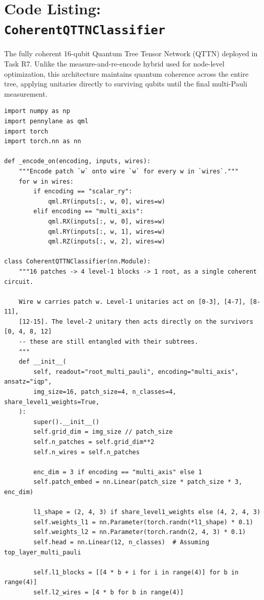 \documentclass[12pt, a4paper, oneside]{report}
\begin{document}
\section*{Code Listing: \texttt{CoherentQTTNClassifier}}
The fully coherent 16-qubit Quantum Tree Tensor Network (QTTN) deployed in Task R7. Unlike the measure-and-re-encode hybrid used for node-level optimization, this architecture maintains quantum coherence across the entire tree, applying unitaries directly to surviving qubits until the final multi-Pauli measurement.

\begin{verbatim}
import numpy as np
import pennylane as qml
import torch
import torch.nn as nn

def _encode_on(encoding, inputs, wires):
    """Encode patch `w` onto wire `w` for every w in `wires`."""
    for w in wires:
        if encoding == "scalar_ry":
            qml.RY(inputs[:, w, 0], wires=w)
        elif encoding == "multi_axis":
            qml.RX(inputs[:, w, 0], wires=w)
            qml.RY(inputs[:, w, 1], wires=w)
            qml.RZ(inputs[:, w, 2], wires=w)

class CoherentQTTNClassifier(nn.Module):
    """16 patches -> 4 level-1 blocks -> 1 root, as a single coherent circuit.

    Wire w carries patch w. Level-1 unitaries act on [0-3], [4-7], [8-11],
    [12-15]. The level-2 unitary then acts directly on the survivors [0, 4, 8, 12]
    -- these are still entangled with their subtrees.
    """
    def __init__(
        self, readout="root_multi_pauli", encoding="multi_axis", ansatz="iqp",
        img_size=16, patch_size=4, n_classes=4, share_level1_weights=True,
    ):
        super().__init__()
        self.grid_dim = img_size // patch_size
        self.n_patches = self.grid_dim**2
        self.n_wires = self.n_patches

        enc_dim = 3 if encoding == "multi_axis" else 1
        self.patch_embed = nn.Linear(patch_size * patch_size * 3, enc_dim)

        l1_shape = (2, 4, 3) if share_level1_weights else (4, 2, 4, 3)
        self.weights_l1 = nn.Parameter(torch.randn(*l1_shape) * 0.1)
        self.weights_l2 = nn.Parameter(torch.randn(2, 4, 3) * 0.1)
        self.head = nn.Linear(12, n_classes)  # Assuming top_layer_multi_pauli

        self.l1_blocks = [[4 * b + i for i in range(4)] for b in range(4)]
        self.l2_wires = [4 * b for b in range(4)]


\end{verbatim}
\end{document}
